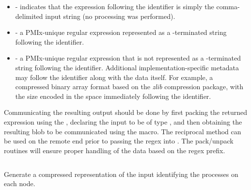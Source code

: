 \begin{itemize}
    \item {} - indicates that the expression following the identifier is simply the comma-delimited input string (no processing was performed).
    \item {} - a \ac{PMIx}-unique regular expression represented as a -terminated string following the identifier.
    \item {} - a \ac{PMIx}-unique regular expression that is not represented as a -terminated string following the identifier. Additional implementation-specific metadata may follow the identifier along with the data itself. For example, a compressed binary array format based on the \emph{zlib} compression package, with the size encoded in the space immediately following the identifier.
\end{itemize}

Communicating the resulting output should be done by first packing the returned expression using the , declaring the input to be of type , and then obtaining the resulting blob to be communicated using the  macro. The reciprocal method can be used on the remote end prior to passing the regex into . The pack/unpack routines will ensure proper handling of the data based on the regex prefix.


\subsection{}

\summary

Generate a compressed representation of the input identifying the processes on each node.

\format


\begin{arglist}
\end{arglist}

\returnsimple

